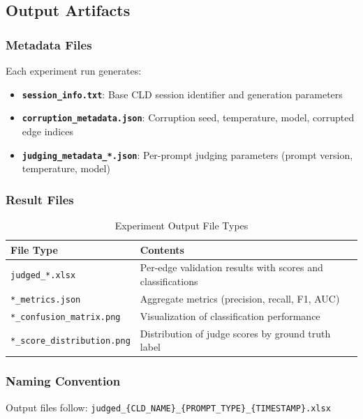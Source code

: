 \subsection{Output Artifacts}
\label{sec:output_artifacts}

\subsubsection{Metadata Files}

Each experiment run generates:
\begin{itemize}[noitemsep]
    \item \textbf{\texttt{session\_info.txt}}: Base CLD session identifier and generation parameters
    \item \textbf{\texttt{corruption\_metadata.json}}: Corruption seed, temperature, model, corrupted edge indices
    \item \textbf{\texttt{judging\_metadata\_*.json}}: Per-prompt judging parameters (prompt version, temperature, model)
\end{itemize}

\subsubsection{Result Files}

\begin{table}[H]
\centering
\caption{Experiment Output File Types}
\label{tab:output_files}
\footnotesize
\begin{tabular}{@{}ll@{}}
\toprule
\textbf{File Type} & \textbf{Contents} \\
\midrule
\texttt{judged\_*.xlsx} & Per-edge validation results with scores and classifications \\
\texttt{*\_metrics.json} & Aggregate metrics (precision, recall, F1, AUC) \\
\texttt{*\_confusion\_matrix.png} & Visualization of classification performance \\
\texttt{*\_score\_distribution.png} & Distribution of judge scores by ground truth label \\
\bottomrule
\end{tabular}
\end{table}

\subsubsection{Naming Convention}

Output files follow: \texttt{judged\_\{CLD\_NAME\}\_\{PROMPT\_TYPE\}\_\{TIMESTAMP\}.xlsx}

